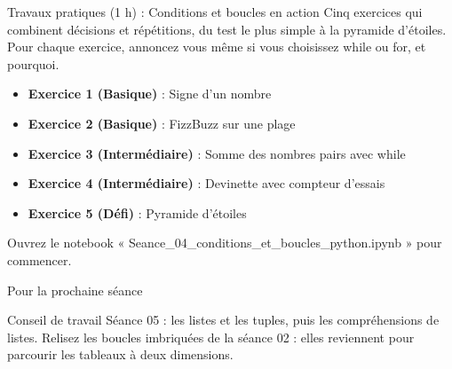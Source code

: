 \documentclass[aspectratio=169,11pt]{beamer}
\begin{document}
\begin{frame}{Travaux pratiques (1 h) : Conditions et boucles en action}
Cinq exercices qui combinent décisions et répétitions, du test le plus simple à la pyramide d'étoiles. Pour chaque exercice, annoncez vous même si vous choisissez while ou for, et pourquoi.

\begin{itemize}
  \setlength{\itemsep}{1.5pt}\setlength{\parskip}{0pt}
  \item \textbf{Exercice 1 (Basique)} : Signe d'un nombre
  \item \textbf{Exercice 2 (Basique)} : FizzBuzz sur une plage
  \item \textbf{Exercice 3 (Intermédiaire)} : Somme des nombres pairs avec while
  \item \textbf{Exercice 4 (Intermédiaire)} : Devinette avec compteur d'essais
  \item \textbf{Exercice 5 (Défi)} : Pyramide d'étoiles
\end{itemize}
\vspace{4pt}

{\small\color{PyGris}Ouvrez le notebook « Seance\_04\_conditions\_et\_boucles\_python.ipynb » pour commencer.}
\end{frame}
\begin{frame}{Pour la prochaine séance}
\begin{exampleblock}{Conseil de travail}
Séance 05 : les listes et les tuples, puis les compréhensions de listes. Relisez les boucles imbriquées de la séance 02 : elles reviennent pour parcourir les tableaux à deux dimensions.
\end{exampleblock}
\end{frame}
\end{document}

